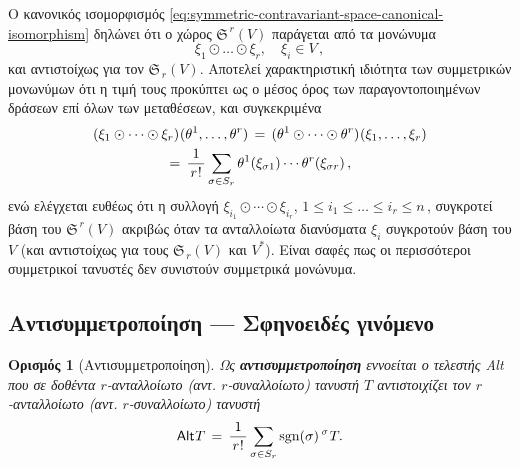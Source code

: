 \documentclass[11pt,a4paper,twoside,openright]{book}
\newtheorem{definition}[lemma]{Ορισμός}
\begin{document}
Ο κανονικός ισομορφισμός \eqref{eq:symmetric-contravariant-space-canonical-isomorphism} δηλώνει ότι
ο χώρος $\mathfrak{S}^{\,r}(V)$ παράγεται από τα μονώνυμα
\begin{equation*}
\xi_1 \odot \dots \odot \xi_r,
\quad
\xi_i \in V\,,
\end{equation*}
και αντιστοίχως για τον $\mathfrak{S}_{\,r}(V)$. Αποτελεί χαρακτηριστική ιδιότητα των συμμετρικών μονωνύμων ότι η τιμή τους προκύπτει ως ο μέσος όρος των παραγοντοποιημένων δράσεων επί όλων των μεταθέσεων, και συγκεκριμένα
\begin{equation}\label{eq:symmetric-mononyms-property}
\begin{split}
(\xi_1 \odot \dots \odot \xi_r)\hspace{.5pt}(\theta^1, \dots, \theta^r)
\,&=\,
(\theta^1 \odot \dots \odot \theta^r)\hspace{.5pt}(\xi_1, \dots, \xi_r)\\
\,=\,
\frac{1}{\,r\hspace{.5pt}!\,}
\sum_{\sigma \in S_r}
\theta^1&(\xi_{\sigma 1}) \cdots \theta^r(\xi_{\sigma r})\,,
\end{split}
\end{equation}
ενώ ελέγχεται ευθέως ότι η συλλογή
$\xi_{i_1} \odot \cdots \odot \xi_{i_r}$,
$1 \le i_1 \le \dots \le i_r \le n\,$,
συγκροτεί βάση του $\mathfrak{S}^{\,r}(V)$
ακριβώς όταν τα ανταλλοίωτα διανύσματα $\xi_i$
συγκροτούν βάση του $V$ (και αντιστοίχως για τους $\mathfrak{S}_{\,r}(V)$ και $V^*$). Είναι σαφές πως οι περισσότεροι συμμετρικοί τανυστές δεν συνιστούν συμμετρικά μονώνυμα.

\subsection{Αντισυμμετροποίηση --- Σφηνοειδές γινόμενο}
	\label{sec:antisymmetric-tensors}

\begin{definition}[Αντισυμμετροποίηση]\label{def:antisymmetrization}
Ως \textbf{αντισυμμετροποίηση} εννοείται ο τελεστής \textup{\textsf{Alt}} που σε δοθέντα $r$-ανταλλοίωτο (αντ. $r$-συναλλοίωτο) τανυστή $Τ$ αντιστοιχίζει τον $r$-ανταλλοίωτο (αντ. $r$-συναλλοίωτο) τανυστή
\begin{equation}\label{eq:antisymmetrization}
\textup{\textsf{Alt}}\hspace{.5pt}T
\,=\,
\frac{1}{\,r\hspace{.5pt}!\,}
\sum_{\sigma \in S_r}
\operatorname{sgn}(\sigma)
\,
{}^\sigma\hspace{.5pt}{T}.
\end{equation}
\end{definition}
\end{document}
